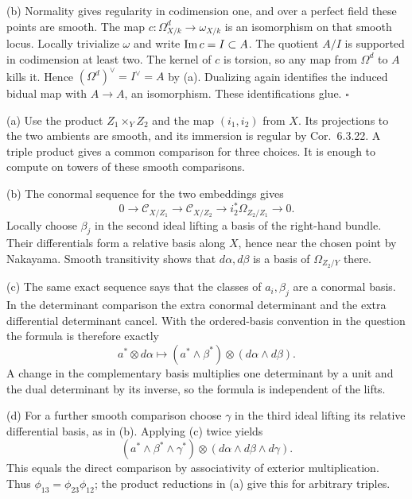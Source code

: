 \documentclass[11pt]{article}
\let\chapterexercise\exercise
\renewcommand{\exercise}[2]{\Needspace{8\baselineskip}\chapterexercise{#1}{#2}}
\begin{document}
(b) Normality gives regularity in codimension one, and over a perfect field these points are smooth. The map $c:\Omega^d_{X/k}\to\omega_{X/k}$ is an isomorphism on that smooth locus. Locally trivialize $\omega$ and write $\operatorname{Im} c=I\subset A$. The quotient $A/I$ is supported in codimension at least two. The kernel of $c$ is torsion, so any map from $\Omega^d$ to $A$ kills it. Hence $(\Omega^d)^\vee=I^\vee=A$ by (a). Dualizing again identifies the induced bidual map with $A\to A$, an isomorphism. These identifications glue. \hfill$\square$

\pf
(a) Use the product $Z_1\times_YZ_2$ and the map $(i_1,i_2)$ from $X$. Its projections to the two ambients are smooth, and its immersion is regular by Cor.~6.3.22. A triple product gives a common comparison for three choices. It is enough to compute on towers of these smooth comparisons.

(b) The conormal sequence for the two embeddings gives
\[ 0\to\mathcal C_{X/Z_1}\to\mathcal C_{X/Z_2}\to i_2^*\Omega_{Z_2/Z_1}\to0. \]
Locally choose $\beta_j$ in the second ideal lifting a basis of the right-hand bundle. Their differentials form a relative basis along $X$, hence near the chosen point by Nakayama. Smooth transitivity shows that $d\alpha,d\beta$ is a basis of $\Omega_{Z_2/Y}$ there.

(c) The same exact sequence says that the classes of $a_i,\beta_j$ are a conormal basis. In the determinant comparison the extra conormal determinant and the extra differential determinant cancel. With the ordered-basis convention in the question the formula is therefore exactly
\[ a^*\otimes d\alpha\longmapsto(a^*\wedge\beta^*)\otimes(d\alpha\wedge d\beta). \]
A change in the complementary basis multiplies one determinant by a unit and the dual determinant by its inverse, so the formula is independent of the lifts.

(d) For a further smooth comparison choose $\gamma$ in the third ideal lifting its relative differential basis, as in (b). Applying (c) twice yields
\[ (a^*\wedge\beta^*\wedge\gamma^*)\otimes(d\alpha\wedge d\beta\wedge d\gamma). \]
This equals the direct comparison by associativity of exterior multiplication. Thus $\phi_{13}=\phi_{23}\phi_{12}$; the product reductions in (a) give this for arbitrary triples.
\end{document}
